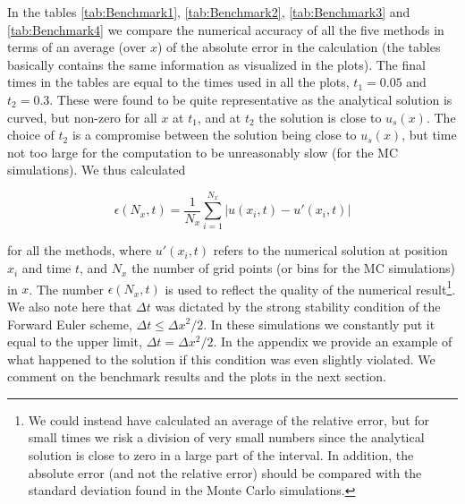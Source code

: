\documentclass[a4paper, 11pt, notitlepage,english]{article}
\begin{document}
In the tables \ref{tab:Benchmark1}, \ref{tab:Benchmark2}, \ref{tab:Benchmark3} and \ref{tab:Benchmark4} we compare the numerical accuracy of all the five methods in terms of an average (over $x$) of the absolute error in the calculation (the tables basically contains the same information as visualized in the plots). The final times in the tables are equal to the times used in all the plots, $t_1 = 0.05$ and $t_2 = 0.3$. These were found to be quite representative as the analytical solution is curved, but non-zero for all $x$ at $t_1$, and at $t_2$ the solution is close to $u_s(x)$. The choice of $t_2$ is a compromise between the solution being close to $u_s(x)$, but time not too large for the computation to be unreasonably slow (for the MC simulations). We thus calculated

\begin{equation}
\epsilon(N_x,t) = \frac{1}{N_x}\sum_{i=1}^{N_x} \lvert u(x_i,t) - u'(x_i,t) \rvert
\label{eq:Mean_absolute_error}
\end{equation}

for all the methods, where $u'(x_i,t)$ refers to the numerical solution at position $x_i$ and time $t$, and $N_x$ the number of grid points (or bins for the MC simulations) in $x$. The number $\epsilon(N_x,t)$ is used to reflect the quality of the numerical result\footnote{We could instead have calculated an average of the relative error, but for small times we risk a division of very small numbers since the analytical solution is close to zero in a large part of the interval. In addition, the absolute error (and not the relative error) should be compared with the standard deviation found in the Monte Carlo simulations.}. We also note here that $\Delta t$ was dictated by the strong stability condition of the Forward Euler scheme, $\Delta t \leq \Delta x^2 /2$. In these simulations we constantly put it equal to the upper limit, $\Delta t = \Delta x^2 /2$. In the appendix we provide an example of what happened to the solution if this condition was even slightly violated. We comment on the benchmark results and the plots in the next section.
\end{document}
